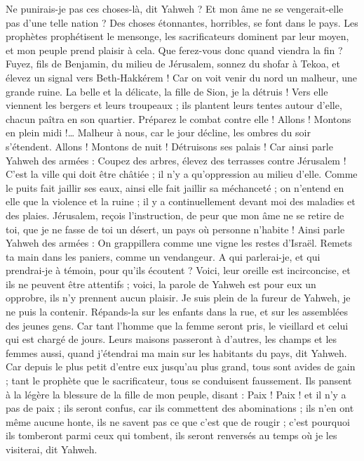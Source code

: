 \begin{multicols}{2}
Ne punirais-je pas ces choses-là, dit Yahweh ? Et mon âme ne se vengerait-elle pas d'une telle nation ?
Des choses étonnantes, horribles, se font dans le pays.
Les prophètes prophétisent le mensonge, les sacrificateurs dominent par leur moyen, et mon peuple prend plaisir à cela. Que ferez-vous donc quand viendra la fin ?
\VerseOne{}Fuyez, fils de Benjamin, du milieu de Jérusalem, sonnez du shofar à Tekoa, et élevez un signal vers Beth-Hakkérem ! Car on voit venir du nord un malheur, une grande ruine.
La belle et la délicate, la fille de Sion, je la détruis !
Vers elle viennent les bergers et leurs troupeaux ; ils plantent leurs tentes autour d'elle, chacun paîtra en son quartier.
Préparez le combat contre elle ! Allons ! Montons en plein midi !… Malheur à nous, car le jour décline, les ombres du soir s'étendent.
Allons ! Montons de nuit ! Détruisons ses palais !
Car ainsi parle Yahweh des armées : Coupez des arbres, élevez des terrasses contre Jérusalem ! C'est la ville qui doit être châtiée ; il n'y a qu'oppression au milieu d'elle.
Comme le puits fait jaillir ses eaux, ainsi elle fait jaillir sa méchanceté ; on n'entend en elle que la violence et la ruine ; il y a continuellement devant moi des maladies et des plaies.
Jérusalem, reçois l'instruction, de peur que mon âme ne se retire de toi, que je ne fasse de toi un désert, un pays où personne n'habite !
Ainsi parle Yahweh des armées : On grappillera comme une vigne les restes d'Israël. Remets ta main dans les paniers, comme un vendangeur.
A qui parlerai-je, et qui prendrai-je à témoin, pour qu'ils écoutent ? Voici, leur oreille est incirconcise, et ils ne peuvent être attentifs ; voici, la parole de Yahweh est pour eux un opprobre, ils n'y prennent aucun plaisir.
Je suis plein de la fureur de Yahweh, je ne puis la contenir. Répands-la sur les enfants dans la rue, et sur les assemblées des jeunes gens. Car tant l'homme que la femme seront pris, le vieillard et celui qui est chargé de jours.
Leurs maisons passeront à d'autres, les champs et les femmes aussi, quand j'étendrai ma main sur les habitants du pays, dit Yahweh.
Car depuis le plus petit d'entre eux jusqu'au plus grand, tous sont avides de gain ; tant le prophète que le sacrificateur, tous se conduisent faussement.
Ils pansent à la légère la blessure de la fille de mon peuple, disant : Paix ! Paix ! et il n'y a pas de paix ;
ils seront confus, car ils commettent des abominations ; ils n'en ont même aucune honte, ils ne savent pas ce que c'est que de rougir ; c'est pourquoi ils tomberont parmi ceux qui tombent, ils seront renversés au temps où je les visiterai, dit Yahweh.

\end{multicols}
